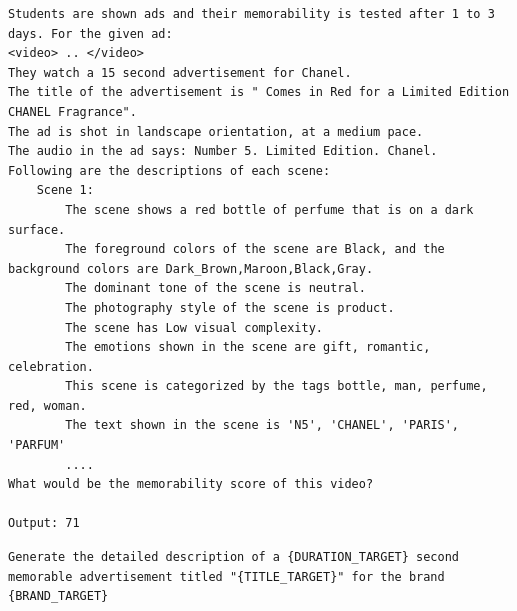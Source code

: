 \begin{lstlisting}[caption={Verbalization pattern to predict memorability given advertisement. The same template is used to prompt GPT-3.5, GPT-4, Henry, Henry-Oracle, and Henry-SEED. Note that video tokens are optional.},frame=single,breaklines=true,basicstyle=\small\ttfamily,label={listing:memorability-prediction-verbalization-format}]
Students are shown ads and their memorability is tested after 1 to 3 days. For the given ad: 
<video> .. </video> 
They watch a 15 second advertisement for Chanel. 
The title of the advertisement is " Comes in Red for a Limited Edition CHANEL Fragrance". 
The ad is shot in landscape orientation, at a medium pace.
The audio in the ad says: Number 5. Limited Edition. Chanel. 
Following are the descriptions of each scene: 
    Scene 1: 
        The scene shows a red bottle of perfume that is on a dark surface.
        The foreground colors of the scene are Black, and the background colors are Dark_Brown,Maroon,Black,Gray.
        The dominant tone of the scene is neutral.
        The photography style of the scene is product. 
        The scene has Low visual complexity.
        The emotions shown in the scene are gift, romantic, celebration. 
        This scene is categorized by the tags bottle, man, perfume, red, woman.
        The text shown in the scene is 'N5', 'CHANEL', 'PARIS', 'PARFUM' 
        ....
What would be the memorability score of this video?

Output: 71
\end{lstlisting}

\begin{lstlisting}[caption={Henry Prompt to generate ad verbalization used to train and evaluate Henry-SEED},frame=single,breaklines=true,basicstyle=\tiny,label={listing:advertisement-generation-prompt-Henry-SEED}]
Generate the detailed description of a {DURATION_TARGET} second memorable advertisement titled "{TITLE_TARGET}" for the brand {BRAND_TARGET}
\end{lstlisting}



